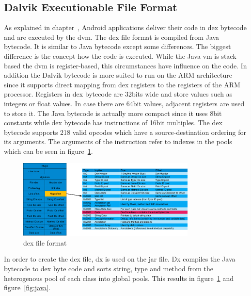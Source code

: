 \subsection{Dalvik Executionable File Format} \label{subsection:android-dex}
As explained in chapter~\cite{subsection:foundation-android-package}, Android applications deliver their code in \gls{dex} bytecode and are executed by the \gls{dvm}.
The dex file format is compiled from Java bytecode. It is similar to Java bytecode except some differences.
The biggest difference is the concept how the code is executed.
While the Java \gls{vm} is stack-based the \gls{dvm} is register-based, this circumstances have influence on the code.
In addition the Dalvik bytecode is more suited to run on the ARM architecture since it supports direct mapping from dex registers to the registers of the ARM processor.
Registers in \gls{dex} bytecode are 32bits wide and store values such as integers or float values.
In case there are 64bit values, adjacent registers are used to store it.
The Java bytecode is actually more compact since it uses 8bit constants while \gls{dex} bytecode has instructions of 16bit multiples.
The \gls{dex} bytecode supports 218 valid opcodes which have a source-destination ordering for its arguments.
The arguments of the instruction refer to indexes in the pools which can be seen in figure~\ref{fig:dex}.
\newline
\begin{figure}[h]
    \centering
    \includegraphics[width=0.8\textwidth]{data/dex.png}
    \caption{\gls{dex} file format \cite{andevconDalvikART}}
    \label{fig:dex}
\end{figure}

In order to create the dex file, dx is used on the \gls{jar} file.
Dx compiles the Java bytecode to \gls{dex} byte code and sorts string, type and method from the heterogenous pool of each class into global pools.
This results in figure~\ref{fig:dex} and figure~\ref{fig:java}.

